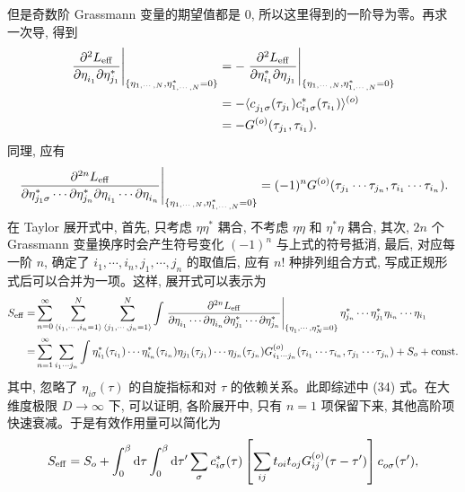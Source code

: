 但是奇数阶 Grassmann 变量的期望值都是 0, 所以这里得到的一阶导为零。再求一次导, 得到 
\begin{equation}
    \begin{aligned}
        \left.\frac{\partial^2 L_{\mathrm{eff}}}{\partial \eta_{i_1}^{ }\partial \eta_{j_1}^*}\right|_{\{\eta_{1,\cdots,N},\eta_{1,\cdots,N}^*=0\}}&=-\left.\frac{\partial^2 L_{\mathrm{eff}}}{\partial \eta_{i_1}^{*}\partial \eta_{j_1}^{ }}\right|_{\{\eta_{1,\cdots,N},\eta_{1,\cdots,N}^*=0\}}\\
        &=- \langle c_{j_1\sigma}^{ }(\tau_{j_1})c_{i_1\sigma}^*(\tau_{i_1}) \rangle^{(o)}\\
        &=-G^{(o)}(\tau_{j_1},\tau_{i_1}).
    \end{aligned}
\end{equation}
同理, 应有
\begin{equation}
    \left.\frac{\partial^{2n}L_{\mathrm{eff}}}{\partial\eta_{j_1\sigma}^*\cdots\partial\eta_{j_n}^*\partial \eta_{i_1}^{ }\cdots\partial \eta_{i_n}^{ }}\right|_{\{\eta_{1,\cdots,N},\eta_{1,\cdots,N}^*=0\}}=(-1)^nG^{(o)}(\tau_{j_1}\cdots\tau_{j_n},\tau_{i_1}\cdots\tau_{i_n}).
\end{equation}
在 Taylor 展开式中, 首先, 只考虑 $\eta\eta^*$ 耦合, 不考虑 $\eta\eta$ 和 $\eta^*\eta$ 耦合, 其次, $2n$ 个 Grassmann 变量换序时会产生符号变化 $(-1)^n$ 与上式的符号抵消, 最后, 对应每一阶 $n$, 确定了 $i_1,\cdots,i_n,j_1,\cdots,j_n$ 的取值后, 应有 $n!$ 种排列组合方式, 写成正规形式后可以合并为一项。这样, 展开式可以表示为
\begin{equation}
    \begin{aligned}
        S_{\mathrm{eff}}=&\sum_{n=0}^\infty \sum_{\langle i_1,\cdots,i_n=1 \rangle}^N\sum_{\langle j_1,\cdots,j_n=1 \rangle}^N\int \left.\frac{\partial^{2n} L_{\mathrm{eff}}}{\partial \eta_{i_1}^{ }\cdots\partial\eta_{i_n}^{ }\partial \eta_{j_1}^*\cdots\partial\eta_{j_n}^*}\right|_{\{\eta_1^{ },\cdots,\eta_N^*=0\}}\eta_{j_n}^*\cdots\eta_{j_1}^*\eta_{i_n}\cdots\eta_{i_1}\\
        =&\sum_{n=1}^\infty \sum_{i_1\cdots j_n}\int\eta_{i_1}^*(\tau_{i_1})\cdots \eta_{i_n}^*(\tau_{i_n})\eta_{j_1}(\tau_{j_1})\cdots \eta_{j_n}(\tau_{j_n})G_{i_1\cdots j_n}^{(o)}(\tau_{i_1}\cdots \tau_{i_n},\tau_{j_1}\cdots \tau_{j_n})+S_o+\mathrm{const.}
    \end{aligned}
\end{equation} 
其中, 忽略了 $\eta_{i\sigma}(\tau)$ 的自旋指标和对 $\tau$ 的依赖关系。此即综述中 (34) 式。在大维度极限 $D\to \infty$ 下, 可以证明, 各阶展开中, 只有 $n=1$ 项保留下来, 其他高阶项快速衰减。于是有效作用量可以简化为 
 \begin{equation}
    S_{\mathrm{eff}}=S_o+\int_0^\beta\mathrm{d}\tau\int_0^\beta\mathrm{d}\tau'\sum_\sigma c_{i\sigma}^*(\tau)\left[ \sum_{ij}t_{oi}t_{oj}G_{ij}^{(o)}(\tau-\tau') \right] c_{o\sigma}^{ }(\tau'),
 \end{equation}
